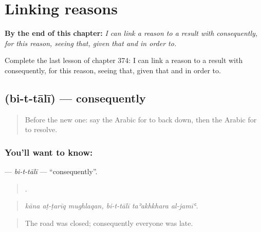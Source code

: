 
\chapter{Linking reasons}
\label{ch:ar-linking-reasons}

\begin{chapteropening}
\textbf{By the end of this chapter:} \emph{I can link a reason to a result with consequently, for this reason, seeing that, given that and in order to.}

Complete the last lesson of chapter 374: I can link a reason to a result with consequently, for this reason, seeing that, given that and in order to.
\end{chapteropening}

\section[\texorpdfstring{\ar{بالتالي} (bi-t-tālī)}{بالتالي (bi-t-tālī)}]{ (bi-t-tālī) — consequently}

\label{lesson:AR-C374-bi-t-tali}



\begin{quote}
Before the new one: say the Arabic for to back down, then the Arabic for to resolve.
\end{quote}

\subsection*{You'll want to know: }
\textbf{} — \emph{bi-t-tālī} — \textquotedblleft{}consequently\textquotedblright{}.

\begin{quote}
     .
\end{quote}

\begin{quote}
\emph{kāna aṭ-ṭarīq mughlaqan, bi-t-tālī taʾakhkhara al-jamīʿ.}
\end{quote}

\begin{quote}
The road was closed; consequently everyone was late.
\end{quote}


